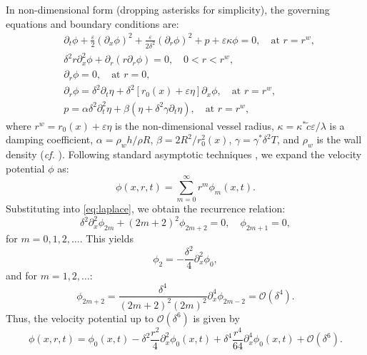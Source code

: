 \documentclass[alpha-refs, 12pt]{wiley-article}
\renewcommand{\O}{\mathcal{O}}
\newcommand{\eps}{\varepsilon}
\begin{document}
In non-dimensional form (dropping asterisks for simplicity), the governing equations and boundary conditions are:
\begin{align}
& \partial_t \phi + \frac{\eps}{2} (\partial_x \phi)^2 + \frac{\eps}{2 \delta^2} (\partial_r \phi)^2 + p + \eps \kappa \phi = 0, \quad \text{at } r = r^w, \label{eq:bernoulli} \\
& \delta^2 r \partial_x^2 \phi + \partial_r (r \partial_r \phi) = 0, \quad 0 < r < r^w, \label{eq:laplace} \\
& \partial_r \phi = 0, \quad \text{at } r = 0, \label{eq:center_bc} \\
& \partial_r \phi = \delta^2 \partial_t \eta + \delta^2 [r_0(x) + \eps \eta] \partial_x \phi, \quad \text{at } r = r^w, \label{eq:wall_bc} \\
& p = \alpha \delta^2 \partial_t^2 \eta + \beta (\eta + \delta^2 \gamma \partial_t \eta), \quad \text{at } r = r^w, \label{eq:pressure}
\end{align}
where $r^w = r_0(x) + \eps \eta$ is the non-dimensional vessel radius, $\kappa = \kappa^* \tilde{c} \eps / \lambda$ is a damping coefficient, $\alpha = \rho_w h / \rho R$, $\beta = 2 R^2 / r_0^2(x)$, $\gamma = \gamma^* \delta^2 T$, and $\rho_w$ is the wall density (\emph{cf.} \citet{Mitsotakis2019}). Following standard asymptotic techniques \citep{BCS}, we expand the velocity potential $\phi$ as:
\begin{equation}\label{eq:potential}
  \phi(x, r, t) = \sum_{m=0}^\infty r^m \phi_m(x, t).
\end{equation}
Substituting into \eqref{eq:laplace}, we obtain the recurrence relation:
\begin{equation}\label{eq:recurr}
  \delta^2 \partial_x^2 \phi_{2m} + (2m + 2)^2 \phi_{2m+2} = 0, \quad \phi_{2m+1} = 0,
\end{equation}
for $m = 0, 1, 2, \dots$. This yields
\begin{equation}\label{eq:phi2}
  \phi_2 = -\frac{\delta^2}{4} \partial_x^2 \phi_0,
\end{equation}
and for $m = 1, 2, \dots$:
\begin{equation}\label{eq:phim}
  \phi_{2m+2} = \frac{\delta^4}{(2m + 2)^2 (2m)^2} \partial_x^4 \phi_{2m-2} = \O(\delta^4).
\end{equation}
  Thus, the velocity potential up to $\O(\delta^6)$ is given by
\begin{equation}\label{eq:potapr}
  \phi(x, r, t) = \phi_0(x, t) - \delta^2 \frac{r^2}{4} \partial_x^2 \phi_0(x, t) + \delta^4 \frac{r^4}{64} \partial_x^4 \phi_0(x, t) + \O(\delta^6).
\end{equation}
\end{document}
